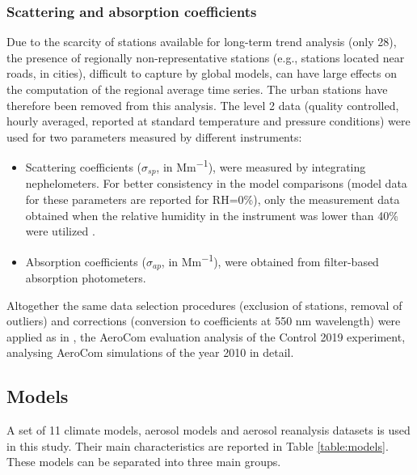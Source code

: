 \documentclass[acp, manuscript]{copernicus}
\begin{document}
\subsubsection{Scattering and absorption coefficients}
Due to the scarcity of stations available for long-term trend analysis (only 28), the presence of regionally non-representative stations (e.g., stations located near roads, in cities), difficult to capture by global models, can have large effects on the computation of the regional average time series. The urban stations have therefore been removed from this analysis. The level 2 data (quality controlled, hourly averaged, reported at standard temperature and pressure conditions) were used for two parameters measured by different instruments:

\begin{itemize}
 \item Scattering coefficients ($\sigma_{sp}$, in \unit{Mm^{-1}}), were measured by integrating nephelometers. For better consistency in the model comparisons (model data for these parameters are reported for RH=0\%), only the measurement data obtained when the relative humidity in the instrument was lower than 40\% were utilized \citep{pandolfi2018european}.
 \item Absorption coefficients ($\sigma_{ap}$, in \unit{Mm^{-1}}), were obtained from filter-based absorption photometers.
\end{itemize}

Altogether the same data selection procedures (exclusion of stations, removal of outliers) and corrections (conversion to coefficients at 550 nm wavelength) were applied as in \cite{jonaseval}, the AeroCom evaluation analysis of the Control 2019 experiment, analysing AeroCom simulations of the year 2010 in detail.

\subsection{Models}
A set of 11 climate models, aerosol models and aerosol reanalysis datasets is used in this study. Their main characteristics are reported in Table \ref{table:models}. These models can be separated into three main groups.
\end{document}
